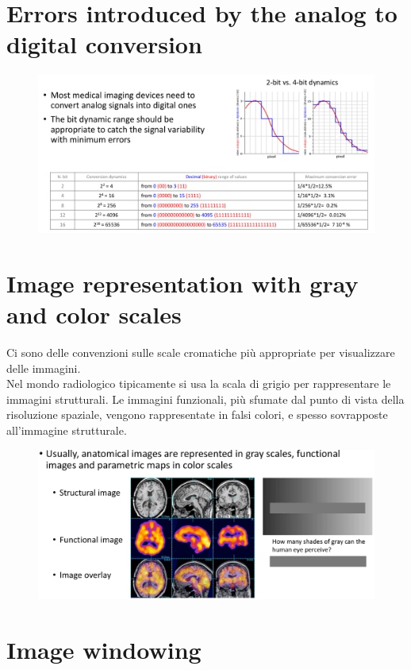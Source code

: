 \section{Errors introduced by the analog to digital conversion}

\begin{figure}[ht]
	\centering
	\includegraphics[width=0.8\linewidth]{figure_med/adc}
	
\end{figure}
\FloatBarrier


\section{Image representation with gray and color scales}
Ci sono delle convenzioni sulle scale cromatiche più appropriate per visualizzare delle immagini.\\
Nel mondo radiologico tipicamente si usa la scala di grigio per rappresentare le immagini strutturali. Le immagini funzionali, più sfumate dal punto di vista della risoluzione spaziale, vengono rappresentate in falsi colori, e spesso sovrapposte all'immagine strutturale.

\begin{figure}[ht]
	\centering
	\includegraphics[width=0.8\linewidth]{figure_med/gray}
\end{figure}
\FloatBarrier

\section{Image windowing}

